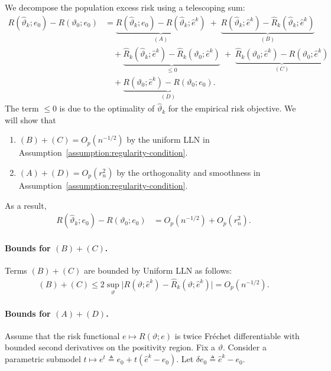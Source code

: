 We decompose the population excess risk using a telescoping sum:
\begin{align}
    R(\widehat{\vartheta}_k; e_0) - R(\vartheta_0; e_0)  &= \underbrace{ R(\widehat{\vartheta}_k; e_0) - R(\widehat{\vartheta}_k; \widehat{e}^{k}) }_{(A)} 
            \;+\; \underbrace{ R(\widehat{\vartheta}_k; \widehat{e}^{k}) - \widehat{R}_k (\widehat{\vartheta}_k; \widehat{e}^{k}) }_{(B)} \\
            &\quad + \underbrace{ \widehat{R}_k (\widehat{\vartheta}_k; \widehat{e}^{k}) - \widehat{R}_k (\vartheta_0; \widehat{e}^{k}) }_{\leq 0} 
            \;+\; \underbrace{ \widehat{R}_k (\vartheta_0; \widehat{e}^{k}) - R(\vartheta_0; \widehat{e}^k) }_{(C)}\\ 
            &\quad + \underbrace{ R(\vartheta_0; \widehat{e}^k) - R(\vartheta_0; e_0) }_{(D)}.
\end{align}
The term $\leq 0$ is due to the optimality of $\widehat{\vartheta}_k$ for the empirical risk objective. We will show that 
\begin{enumerate}
    \item $(B) + (C) = O_p(n^{-1/2})$ by the uniform LLN in Assumption~\ref{assumption:regularity-condition}. 
    \item $(A) + (D) = O_p(r^2_n)$ by the orthogonality and smoothness in Assumption~\ref{assumption:regularity-condition}. 
\end{enumerate}
As a result, 
\begin{align}
    R(\widehat{\vartheta}_k; e_0) - R(\vartheta_0; e_0)  &= O_p(n^{-1/2}) + O_p(r^2_n).
\end{align}

\paragraph{Bounds for $(B) + (C)$.}
Terms $(B) + (C)$ are bounded by Uniform LLN as follows: 
\begin{align}
    (B) + (C)  \le 2\sup_{\vartheta}\big|R(\vartheta;\widehat e^k) - \widehat R_k(\vartheta;\widehat e^k)\big| = O_p(n^{-1/2}).
\end{align}


\paragraph{Bounds for $(A) + (D)$.}
Assume that the risk functional $e \mapsto R(\vartheta; e)$ is twice Fréchet differentiable with bounded second derivatives on the positivity region. Fix a $\vartheta$. Consider a parametric submodel $t \mapsto e^t \triangleq e_0 + t(\widehat{e}^k - e_0)$. Let $\delta e_0 \triangleq \widehat{e}^k - e_0$.

